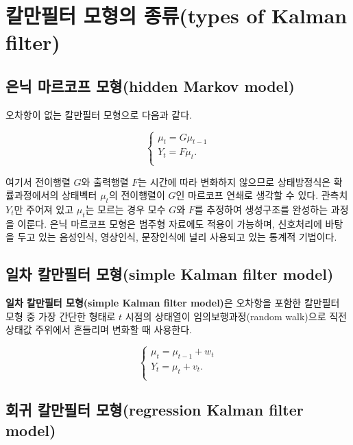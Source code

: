 \documentclass[b5paper,]{scrbook}
\theoremstyle{plain}
\theoremstyle{definition}
\numberwithin{equation}{section}
\begin{document}
\hypertarget{--types-of-kalman-filter}{%
\section{칼만필터 모형의 종류(types of Kalman filter)}\label{--types-of-kalman-filter}}

\hypertarget{--hidden-markov-model}{%
\subsection{은닉 마르코프 모형(hidden Markov model)}\label{--hidden-markov-model}}

오차항이 없는 칼만필터 모형으로 다음과 같다.

\[
\begin{cases}
\mu_{t}=G\mu_{t-1} \\
Y_{t}=F\mu_{t}.\\
\end{cases}
\]

여기서 전이행렬 \(G\)와 출력행렬 \(F\)는 시간에 따라 변화하지 않으므로 상태방정식은 확률과정에서의 상태벡터 \(\mu_{t}\)의 전이행렬이 \(G\)인 마르코프 연쇄로 생각할 수 있다. 관측치 \(Y_{t}\)만 주어져 있고 \(\mu_{t}\)는 모르는 경우 모수 \(G\)와 \(F\)를 추정하여 생성구조를 완성하는 과정을 이룬다. 은닉 마르코프 모형은 범주형 자료에도 적용이 가능하며, 신호처리에 바탕을 두고 있는 음성인식, 영상인식, 문장인식에 널리 사용되고 있는 통계적 기법이다.

\hypertarget{--simple-kalman-filter-model}{%
\subsection{일차 칼만필터 모형(simple Kalman filter model)}\label{--simple-kalman-filter-model}}

\textbf{일차 칼만필터 모형(simple Kalman filter model)}은 오차항을 포함한 칼만필터 모형 중 가장 간단한 형태로 \(t\) 시점의 상태열이 임의보행과정(random walk)으로 직전 상태값 주위에서 흔들리며 변화할 때 사용한다.

\[
\begin{cases}
\mu_{t}=\mu_{t-1}+w_{t} \\
Y_{t}=\mu_{t}+v_{t}.\\
\end{cases}
\]

\hypertarget{--regression-kalman-filter-model}{%
\subsection{회귀 칼만필터 모형(regression Kalman filter model)}\label{--regression-kalman-filter-model}}
\end{document}
